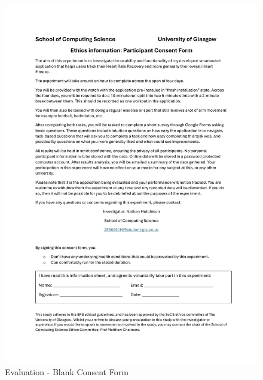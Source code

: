 \documentclass{l4proj}
\begin{document}
\begin{figure}[h!]
    \centering
    \includegraphics[width=1\linewidth]{dissertation//dissImages/ConsentForm.pdf}
    \caption{Evaluation - Blank Consent Form}
\end{figure}
\end{document}
